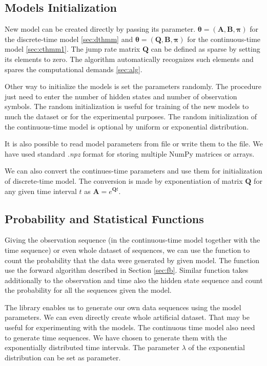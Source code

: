 \documentclass[thesis=M,english]{FITthesis}[2012/10/20]
\newcommand{\matr}[1]{\mathbf{#1}}
\begin{document}
\subsection{Models Initialization}

New model can be created directly by passing its parameter. $\boldsymbol\theta = ( \matr{A}, \matr{B}, \boldsymbol\pi )$ for the discrete-time model \ref{sec:dthmm} and $\boldsymbol\theta = ( \matr{Q}, \matr{B}, \boldsymbol\pi )$ for the continuous-time model \ref{sec:cthmm1}. The jump rate matrix $\matr{Q}$ can be defined as sparse by setting its elements to zero. The algorithm automatically recognizes such elements and spares the computational demands \ref{sec:alg}.

Other way to initialize the models is set the parameters randomly. The procedure just need to enter the number of hidden states and number of observation symbols. The random initialization is useful for training of the new models to much the dataset or for the experimental purposes. The random initialization of the continuous-time model is optional by uniform or exponential distribution.

It is also possible to read model parameters from file or write them to the file. We have used standard \textit{.npz} format for storing multiple NumPy matrices or arrays.      
 
We can also convert the continues-time parameters and use them for initialization of discrete-time model. The conversion is made by exponentiation of matrix $\matr{Q}$ for any given time interval $t$ as $\matr{A} = e^{\matr{Q}t}$. 
 
\subsection{Probability and Statistical Functions}

Giving the observation sequence (in the continuous-time model together with the time sequence) or even whole dataset of sequences, we can use the function to count the probability that the data were generated by given model. The function use the forward algorithm described in Section \ref{sec:fb}. Similar function takes additionally to the observation and time also the hidden state sequence and count the probability for all the sequences given the model.

The library enables us to generate our own data sequences using the model parameters. We can even directly create whole artificial dataset. That may be useful for experimenting with the models. 
The continuous time model also need to generate time sequences. We have chosen to generate them with the exponentially distributed time intervals. The parameter $\lambda$ of the exponential distribution can be set as parameter.   
\end{document}
